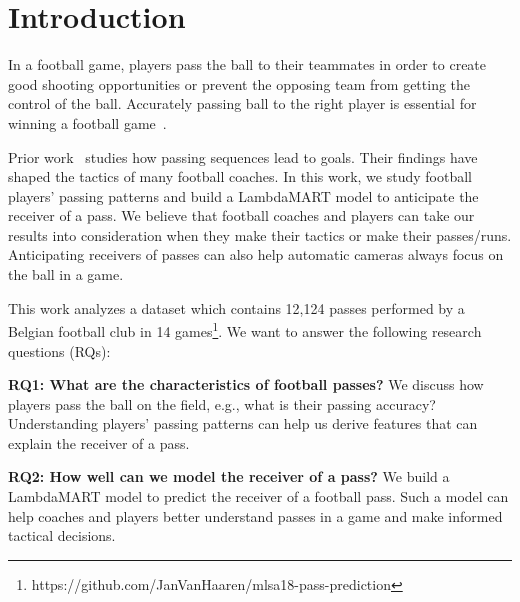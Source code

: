 \section{Introduction} \label{intro}
In a football game, players pass the ball to their teammates in order to create good shooting opportunities or prevent the opposing team from getting the control of the ball.
Accurately passing ball to the right player is essential for winning a football game~\cite{Ali2011Measuring,Hughes2005Analysis}.

Prior work~\cite{reep1968skill,Hughes2005Analysis} studies how passing sequences lead to goals. Their findings have shaped the tactics of many football coaches.
In this work, we study football players' passing patterns and build a LambdaMART model to anticipate the receiver of a pass.
We believe that football coaches and players can take our results into consideration when they make their tactics or make their passes/runs. 
Anticipating receivers of passes can also help automatic cameras always focus on the ball in a game.

This work analyzes a dataset which contains 12,124 passes performed by a Belgian football club in 14 games\footnote{\label{origin_dataset}https://github.com/JanVanHaaren/mlsa18-pass-prediction}. We want to answer the following research questions (RQs): 

\begin{description}
	\item \textbf{RQ1: What are the characteristics of football passes?}
	We discuss how players pass the ball on the field, e.g., what is their passing accuracy? %
	Understanding players' passing patterns can help us derive features that can explain the receiver of a pass. 
	
	\item \textbf{RQ2: How well can we model the receiver of a pass?}
	We build a LambdaMART model to predict the receiver of a football pass. 
	Such a model can help coaches and players better understand passes in a game and make informed tactical decisions.
	
\end{description}

